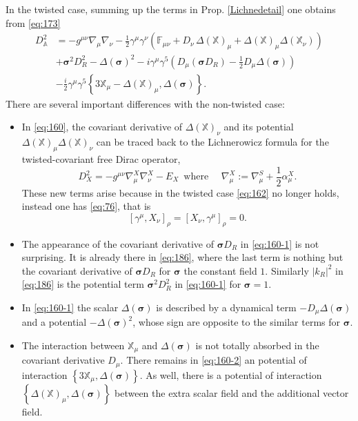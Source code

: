 \documentclass[11pt]{article}
\newcommand{\sig}{{\boldsymbol{\sigma}}}
\newcommand{\XX}{{\mathbb X}}
\begin{document}
In the twisted case, summing up the terms in Prop. \ref{Lichnedetail} one
obtains from \eqref{eq:173}
\begin{align}
  \label{eq:160}
  D_{\mathbb A}^2 &= -g^{\mu\nu}\nabla_\mu\nabla_\nu 
-\frac 12
    \gamma^\mu\gamma^\nu\left(\mathbb{F}_{\mu\nu} + D_\nu\, \Delta(\mathbb
    X)_\mu + \Delta(\XX)_\mu\Delta(\XX_\nu)\right) \\
  \label{eq:160-1}
& + \sig^2D_R^2 - \Delta(\sig)^2 -
  i\gamma^\mu\gamma^5\left( D_\mu (\sig D_R) - \frac 12 D_\mu
    \Delta(\sig)\right) \\
  \label{eq:160-2}
& - \frac i2
  \gamma^\mu\gamma^5\left\{3\XX_\mu - \Delta(\XX)_\mu, \Delta(\sig)\right\}.  
\end{align}
There are several important differences with the non-twisted case:
\begin{itemize}
\item In \eqref{eq:160}, the covariant derivative of $\Delta(\XX)_\nu$ and its potential
$\Delta(\XX)_\mu\Delta(\XX)_\nu$ can be traced back  to the Lichnerowicz formula for the twisted-covariant
free Dirac operator, 
\begin{equation}
  D_X^2= -g^{\mu\nu} \nabla^X_\mu \nabla^X_\nu - E_X\, \text{ where } \quad 
\nabla^X_\mu:= \nabla_\mu^S + \frac 12 \alpha_\mu^X.
\label{eq:172}
\end{equation}
These new terms arise because in the twisted case \eqref{eq:162} no
longer holds, instead one has
\eqref{eq:76}, that is
\begin{equation}
  \label{eq:134}
  [\gamma^\mu, X_\nu]_\rho = [X_\nu, \gamma^\mu]_\rho = 0.
\end{equation}

\item The appearance of the covariant derivative of $\sig D_R$ in
  \eqref{eq:160-1} is not surprising. It is already there in \eqref{eq:186}, where the last
  term  is nothing but the covariant derivative of $\sig D_R$ for $\sig$ the constant field $1$. Similarly $|k_R|^2$ in \eqref{eq:186} is the potential term $\sig^2D_R^2$  in \eqref{eq:160-1}  for $\sig=1$.

\item  In \eqref{eq:160-1} the scalar $\Delta(\sig)$ is described by  a dynamical term
  $-D_\mu \Delta(\sig)$ and a potential $-\Delta(\sig)^2$, whose sign
  are opposite to the similar terms for $\sig$.

\item  The interaction between $\XX_\mu$ and $\Delta(\sig)$ is not
  totally absorbed in the covariant derivative $D_\mu$. There remains
  in  \eqref{eq:160-2}
  an potential of interaction $\left\{3\XX_\mu, \Delta(\sig)
  \right\}$. As well, there is a potential of interaction $\left\{\Delta(\XX)_\mu,
    \Delta(\sig) \right\}$ between the extra scalar field and the
  additional vector field.
\end{itemize}
\end{document}
